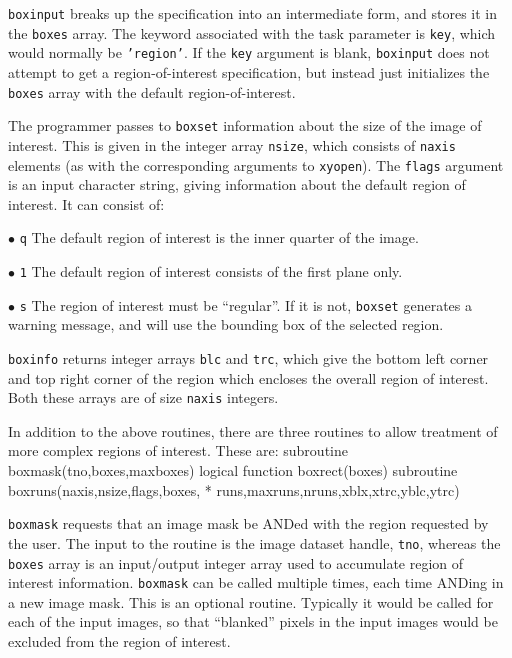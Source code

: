 {\tt boxinput} breaks up the specification into an intermediate form, and
stores it in the {\tt boxes} array.
The keyword associated with the task parameter is {\tt key},
which would normally be {\tt 'region'}. If the {\tt key} argument is blank,
{\tt boxinput} does not attempt to get a region-of-interest specification,
but instead just initializes the {\tt boxes} array with the default
region-of-interest.

The programmer passes to {\tt boxset} information about the size of the image
of interest. This is given in the integer array {\tt nsize}, which consists
of {\tt naxis} elements (as with the corresponding arguments to {\tt xyopen}).
The {\tt flags} argument is an input character string, giving information
about the default region of interest. It can consist of:
\item{$\bullet$} {\tt q} The default region of interest is the inner
quarter of the image.
\item{$\bullet$} {\tt 1} The default region of interest consists of
the first plane only.
\item{$\bullet$} {\tt s} The region of interest must be ``regular''. If
it is not, {\tt boxset} generates a warning message, and will use the
bounding box of the selected region.

{\tt boxinfo} returns integer arrays {\tt blc} and {\tt trc}, which give the
bottom
left corner and top right corner of the region which encloses the overall
region of interest. Both these arrays are of size {\tt naxis} integers.


In addition to the above routines, there are three routines to allow treatment
of more complex regions of interest. These are:
{\ninepoint\begintt
        subroutine boxmask(tno,boxes,maxboxes)
        logical function boxrect(boxes)
        subroutine boxruns(naxis,nsize,flags,boxes,
    *        runs,maxruns,nruns,xblx,xtrc,yblc,ytrc)
\endtt}

{\tt boxmask} requests that an image mask be ANDed with the region
requested by the user. The input to the routine is the image dataset handle,
{\tt tno}, whereas the {\tt boxes} array is an input/output integer array
used to accumulate region of interest information. {\tt boxmask} can be
called multiple times, each time ANDing in a new image mask. This is an optional
routine. Typically it would be called for each of the input images, so that
``blanked'' pixels in the input images would be excluded from the region of
interest.

